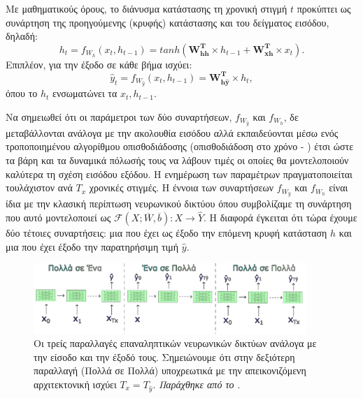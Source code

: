 Με μαθηματικούς όρους, το διάνυσμα κατάστασης τη χρονική στιγμή $t$ προκύπτει ως συνάρτηση της προηγούμενης (κρυφής) κατάστασης και του δείγματος εισόδου, δηλαδή:
\begin{equation}
  h_t = f_{W_{h}}(x_t, h_{t-1}) = tanh(\boldsymbol{W_{hh}^T}\times h_{t-1}+\boldsymbol{W_{xh}^T}\times x_t) .
\end{equation}
Επιπλέον, για την έξοδο σε κάθε βήμα ισχύει:
\begin{equation}
  \label{eq:ytrnn}
  \hat{y}_{t} = f_{W_{\hat{y}}}(x_t, h_{t-1}) = \boldsymbol{W_{h\hat{y}}^T}\times h_t,
\end{equation} όπου το $h_t$ ενσωματώνει τα $x_t, h_{t-1}$.\par

Να σημειωθεί ότι οι παράμετροι των δύο συναρτήσεων, $f_{W_{\hat{y}}}$ και $f_{W_{h}}$, δε μεταβάλλονται ανάλογα με την ακολουθία εισόδου αλλά εκπαιδεύονται μέσω ενός τροποποιημένου αλγορίθμου οπισθοδιάδοσης (οπισθοδιάδοση στο χρόνο - ) έτσι ώστε τα βάρη και τα δυναμικά πόλωσής τους να λάβουν τιμές οι οποίες θα μοντελοποιούν καλύτερα τη σχέση εισόδου εξόδου. Η ενημέρωση των παραμέτρων πραγματοποιείται τουλάχιστον ανά $T_x$ χρονικές στιγμές. Η έννοια των συναρτήσεων $f_{W_{\hat{y}}}$ και $f_{W_{h}}$ είναι ίδια με την κλασική περίπτωση νευρωνικού δικτύου όπου συμβολίζαμε τη συνάρτηση που αυτό μοντελοποιεί ως $\mathcal{F}(X;\overline{W},\overline{b}):X \rightarrow \hat{Y}$. Η διαφορά έγκειται ότι τώρα έχουμε δύο τέτοιες συναρτήσεις: μια που έχει ως έξοδο την επόμενη κρυφή κατάσταση $h$ και μια που έχει έξοδο την παρατηρήσιμη τιμή $\hat{y}$.\par

\begin{figure}[h]
  \centering
  \includegraphics[width=0.92\textwidth]{images/chapter theoritical background/rnn_types_gr.pdf}
  \caption{Οι τρείς παραλλαγές επαναληπτικών νευρωνικών δικτύων ανάλογα με την είσοδο και την έξοδό τους. Σημειώνουμε ότι στην δεξιότερη παραλλαγή (Πολλά σε Πολλά) υποχρεωτικά με την απεικονιζόμενη αρχιτεκτονική ισχύει $T_x = T_{\hat{y}}$. \textit{Παράχθηκε από το \href{https://inkscape.org/}{}}.}
  \label{fig:rnn_types}
\end{figure}

